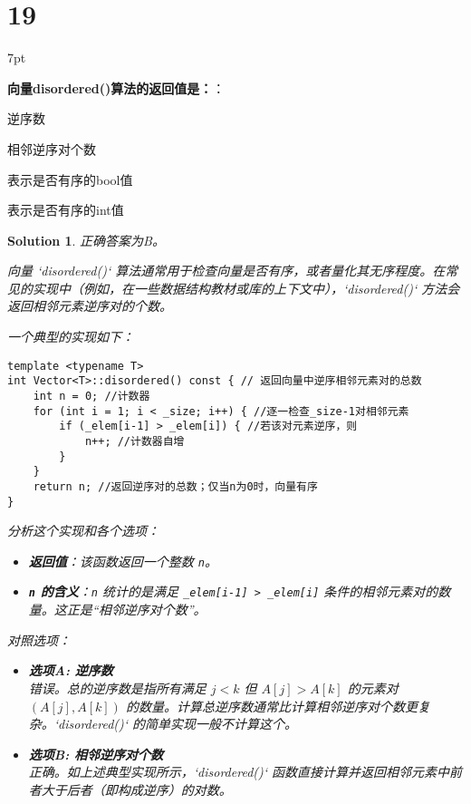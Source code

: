 \documentclass[UTF8]{report}
\newtheorem{solution}{Solution}
\theoremstyle{MyLineTheoremStyle} %
\theoremstyle{MyBlockTheoremStyle} %
\theoremstyle{MySubsubsectionStyle} %
\newenvironment{graybox}{%
        \def\FrameCommand{%
        \hspace{1pt}%
        {\color{gray}\small \vrule width 2pt}%
        {\color{graybox_color}\vrule width 4pt}%
        \colorbox{graybox_color}%
        }%
        \MakeFramed{\advance\hsize-\width\FrameRestore}%
        \noindent\hspace{-4.55pt}%
        \begin{adjustwidth}{}{7pt}%
        \vspace{2pt}\vspace{2pt}%
        }
        {%
        \vspace{2pt}\end{adjustwidth}\endMakeFramed%
        }
\begin{document}
\section*{19}

\begin{graybox}
\textbf{向量disordered()算法的返回值是：}：
\begin{circledenum}
    \item 逆序数
    \item 相邻逆序对个数
    \item 表示是否有序的bool值
    \item 表示是否有序的int值
\end{circledenum}
\end{graybox}

\begin{solution}
正确答案为B。

向量 `disordered()` 算法通常用于检查向量是否有序，或者量化其无序程度。在常见的实现中（例如，在一些数据结构教材或库的上下文中），`disordered()` 方法会返回相邻元素逆序对的个数。

一个典型的实现如下：
\begin{verbatim}
template <typename T>
int Vector<T>::disordered() const { // 返回向量中逆序相邻元素对的总数
    int n = 0; //计数器
    for (int i = 1; i < _size; i++) { //逐一检查_size-1对相邻元素
        if (_elem[i-1] > _elem[i]) { //若该对元素逆序，则
            n++; //计数器自增
        }
    }
    return n; //返回逆序对的总数；仅当n为0时，向量有序
}
\end{verbatim}

分析这个实现和各个选项：
\begin{itemize}
    \item \textbf{返回值}：该函数返回一个整数 \texttt{n}。
        \item \textbf{\texttt{n} 的含义}：\texttt{n} 统计的是满足 \texttt{\_elem[i-1] > \_elem[i]} 条件的相邻元素对的数量。这正是“相邻逆序对个数”。
    \end{itemize}

对照选项：
\begin{itemize}
    \item \textbf{选项A: 逆序数} \\
    错误。总的逆序数是指所有满足 $j < k$ 但 $A[j] > A[k]$ 的元素对 $(A[j], A[k])$ 的数量。计算总逆序数通常比计算相邻逆序对个数更复杂。`disordered()` 的简单实现一般不计算这个。

    \item \textbf{选项B: 相邻逆序对个数} \\
    正确。如上述典型实现所示，`disordered()` 函数直接计算并返回相邻元素中前者大于后者（即构成逆序）的对数。


\end{itemize}
\end{solution}
\end{document}
